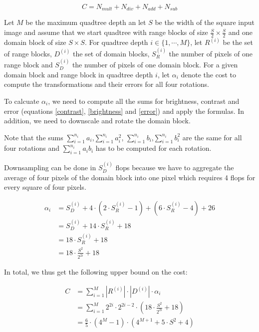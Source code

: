\begin{equation} \label{eq:cost}
C = N_{mult} + N_{div} + N_{add} + N_{sub}
\end{equation}

Let $M$ be the maximum quadtree depth an let $S$ be the width of the square
input image and assume that we start quadtree with range blocks of size
$\frac{S}{2}\times\frac{S}{2}$ and one domain block of size $S\times S$. For
quadtree depth $i \in \{1,\cdots, M\}$, let $R^{(i)}$ be the set of range
blocks, $D^{(i)}$ the set of domain blocks, $S_{R}^{(i)}$ the number of pixels
of one range block and $S_{D}^{(i)}$ the number of pixels of one domain block.
For a given domain block and range block in quadtree depth $i$, let $\alpha_{i}$
denote the cost to compute the transformations and their errors for all four
rotations.

To calcuate $\alpha_{i}$, we need to compute all the sums for brightness,
contrast and error (equations \eqref{contrast}, \eqref{brightness} and
\eqref{error}) and apply the formulas. In addition, we need to downscale and
rotate the domain block.

Note that the sums $\sum_{i=1}^{n_i} a_i$,$\sum_{i=1}^{n_i} a_i^2$,
$\sum_{i=1}^{n_i} b_i$,$\sum_{i=1}^{n_i} b_i^2$ are the same for all four
rotations and $\sum_{i=1}^{n_i} a_i b_i$ has to be computed for each rotation.

Downsampling can be done in $S_{D}^{(i)}$ flops because we have to aggregate the
average of four pixels of the domain block into one pixel which requires 4 flops
for every square of four pixels.

\begin{align}
  \alpha_i &= S_{D}^{(i)} + 4 \cdot (2\cdot S_{R}^{(i)}-1) + (6\cdot S_{R}^{(i)}-4) +  26\\
           &= S_{D}^{(i)} + 14\cdot S_{R}^{(i)} + 18 \\
           &= 18\cdot S_{R}^{(i)} + 18 \\
           &= 18 \cdot \frac{S^2}{2^{2i}} + 18
\end{align}

In total, we thus get the following upper bound on the cost:

\begin{align}
C &= \sum_{i=1}^M |R^{(i)}| \cdot |D^{(i)}| \cdot \alpha_i \\
  &= \sum_{i=1}^M 2^{2i} \cdot 2^{2i-2} \cdot (18 \cdot \frac{S^2}{2^{2i}} + 18) \\
  &= \frac{6}{5}\cdot (4^{M}-1)\cdot (4^{M+1} + 5\cdot S^{2} + 4)
\end{align}

